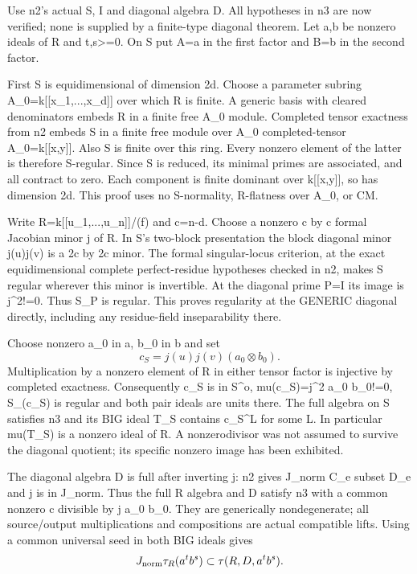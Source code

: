 \documentclass[11pt]{article}
\begin{document}
Use n2's actual S, I and diagonal algebra D. All hypotheses in n3 are now verified; none is supplied by a finite-type diagonal theorem. Let a,b be nonzero ideals of R and t,s>=0. On S put A=a in the first factor and B=b in the second factor.

First S is equidimensional of dimension 2d. Choose a parameter subring A\_0=k[[x\_1,...,x\_d]] over which R is finite. A generic basis with cleared denominators embeds R in a finite free A\_0 module. Completed tensor exactness from n2 embeds S in a finite free module over A\_0 completed-tensor A\_0=k[[x,y]]. Also S is finite over this ring. Every nonzero element of the latter is therefore S-regular. Since S is reduced, its minimal primes are associated, and all contract to zero. Each component is finite dominant over k[[x,y]], so has dimension 2d. This proof uses no S-normality, R-flatness over A\_0, or CM.

Write R=k[[u\_1,...,u\_n]]/(f) and c=n-d. Choose a nonzero c by c formal Jacobian minor j of R. In S's two-block presentation the block diagonal minor j(u)j(v) is a 2c by 2c minor. The formal singular-locus criterion, at the exact equidimensional complete perfect-residue hypotheses checked in n2, makes S regular wherever this minor is invertible. At the diagonal prime P=I its image is j\textasciicircum{}2!=0. Thus S\_P is regular. This proves regularity at the GENERIC diagonal directly, including any residue-field inseparability there.

Choose nonzero a\_0 in a, b\_0 in b and set
\[
c_S=j(u)j(v)(a_0\otimes b_0).
\]
Multiplication by a nonzero element of R in either tensor factor is injective by completed exactness. Consequently c\_S is in S\textasciicircum{}o, mu(c\_S)=j\textasciicircum{}2 a\_0 b\_0!=0, S\_(c\_S) is regular and both pair ideals are units there. The full algebra on S satisfies n3 and its BIG ideal T\_S contains c\_S\textasciicircum{}L for some L. In particular mu(T\_S) is a nonzero ideal of R. A nonzerodivisor was not assumed to survive the diagonal quotient; its specific nonzero image has been exhibited.

The diagonal algebra D is full after inverting j: n2 gives J\_norm C\_e subset D\_e and j is in J\_norm. Thus the full R algebra and D satisfy n3 with a common nonzero c divisible by j a\_0 b\_0. They are generically nondegenerate; all source/output multiplications and compositions are actual compatible lifts. Using a common universal seed in both BIG ideals gives
\[
J_{\rm norm}\tau_R(a^t b^s)\subset\tau(R,D,a^t b^s).
\]
\end{document}
